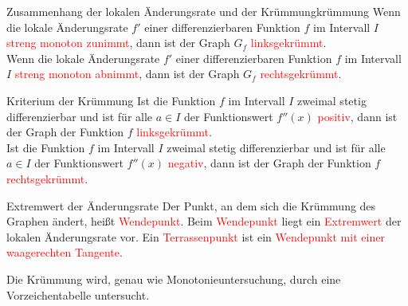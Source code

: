\begin{satz}{Zusammenhang der lokalen Änderungsrate und der Krümmung}{krümmung}
  Wenn die lokale Änderungsrate $f'$ einer differenzierbaren Funktion $f$ im Intervall $I$ \textcolor{red}{streng monoton zunimmt}, dann ist der Graph $G_f$ \textcolor{red}{linksgekrümmt}.  \\
  Wenn die lokale Änderungsrate $f'$ einer differenzierbaren Funktion $f$ im Intervall $I$ \textcolor{red}{streng monoton abnimmt}, dann ist der Graph $G_f$ \textcolor{red}{rechtsgekrümmt}. 
\end{satz}
\begin{satz}{Kriterium der Krümmung}{}
Ist die Funktion $f$ im Intervall $I$ zweimal stetig differenzierbar und ist für alle $a\in I$ der Funktionswert $f''(x)$ \textcolor{red}{positiv}, dann ist der Graph der Funktion $f$ \textcolor{red}{linksgekrümmt}.\\
Ist die Funktion $f$ im Intervall $I$ zweimal stetig differenzierbar und ist für alle $a\in I$ der Funktionswert $f''(x)$ \textcolor{red}{negativ}, dann ist der Graph der Funktion $f$ \textcolor{red}{rechtsgekrümmt}.

\end{satz}
\begin{bem}{Extremwert der Änderungsrate}{}
Der Punkt, an dem sich die Krümmung des Graphen ändert, heißt \textcolor{red}{Wendepunkt}. Beim \textcolor{red}{Wendepunkt} liegt ein \textcolor{red}{Extremwert} der lokalen Änderungsrate vor. Ein \textcolor{red}{Terrassenpunkt} ist ein \textcolor{red}{Wendepunkt mit einer waagerechten Tangente}.
\end{bem}
Die Krümmung wird, genau wie Monotonieuntersuchung, durch eine Vorzeichentabelle untersucht.  

